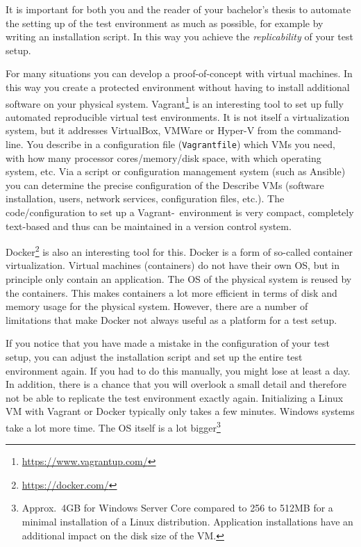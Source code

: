 It is important for both you and the reader of your bachelor's thesis to automate the setting up of the test environment as much as possible, for example by writing an installation script. In this way you achieve the \textit{replicability} of your test setup.

For many situations you can develop a proof-of-concept with virtual machines. In this way you create a protected environment without having to install additional software on your physical system. Vagrant\footnote{\url{https://www.vagrantup.com/}} is an interesting tool to set up fully automated reproducible virtual test environments. It is not itself a virtualization system, but it addresses VirtualBox, VMWare or Hyper-V from the command-line. You describe in a configuration file (\texttt{Vagrantfile}) which VMs you need, with how many processor cores/memory/disk space, with which operating system, etc. Via a script or configuration management system (such as Ansible) you can determine the precise configuration of the Describe VMs (software installation, users, network services, configuration files, etc.). The code/configuration to set up a Va\-grant-\ environment is very compact, completely text-based and thus can be maintained in a version control system.

Docker\footnote{\url{https://docker.com/}} is also an interesting tool for this. Docker is a form of so-called container virtualization. Virtual machines (containers) do not have their own OS, but in principle only contain an application. The OS of the physical system is reused by the containers. This makes containers a lot more efficient in terms of disk and memory usage for the physical system. However, there are a number of limitations that make Docker not always useful as a platform for a test setup.

If you notice that you have made a mistake in the configuration of your test setup, you can adjust the installation script and set up the entire test environment again. If you had to do this manually, you might lose at least a day. In addition, there is a chance that you will overlook a small detail and therefore not be able to replicate the test environment exactly again. Initializing a Linux VM with Vagrant or Docker typically only takes a few minutes. Windows systems take a lot more time. The OS itself is a lot bigger\footnote{Approx.~4GB for Windows Server Core compared to 256 to 512MB for a minimal installation of a Linux distribution. Application installations have an additional impact on the disk size of the VM.}

